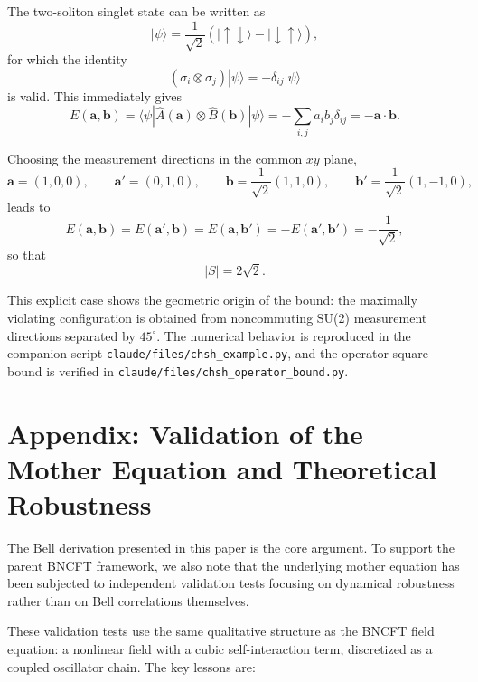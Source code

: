 ﻿\documentclass[11pt,a4paper]{article}
\begin{document}
The two-soliton singlet state can be written as
\begin{equation}
|\psi\rangle = \frac{1}{\sqrt{2}}(|\uparrow\downarrow\rangle-|\downarrow\uparrow\rangle),
\end{equation}
for which the identity
\begin{equation}
(\sigma_i\otimes\sigma_j)|\psi\rangle = -\delta_{ij}|\psi\rangle
\end{equation}
is valid. This immediately gives
\begin{equation}
E(\mathbf{a},\mathbf{b}) = \langle\psi|\hat{A}(\mathbf{a})\otimes\hat{B}(\mathbf{b})|\psi\rangle
= -\sum_{i,j}a_i b_j \delta_{ij} = -\mathbf{a}\cdot\mathbf{b}.
\end{equation}

Choosing the measurement directions in the common $xy$ plane,
\begin{equation}
\mathbf{a}=(1,0,0),\qquad \mathbf{a}'=(0,1,0),\qquad
\mathbf{b}=\frac{1}{\sqrt{2}}(1,1,0),\qquad \mathbf{b}'=\frac{1}{\sqrt{2}}(1,-1,0),
\end{equation}
leads to
\begin{equation}
E(\mathbf{a},\mathbf{b})=E(\mathbf{a}',\mathbf{b})=E(\mathbf{a},\mathbf{b}')=-E(\mathbf{a}',\mathbf{b}')=-\frac{1}{\sqrt{2}},
\end{equation}
so that
\begin{equation}
|S| = 2\sqrt{2}.
\end{equation}

This explicit case shows the geometric origin of the bound: the maximally violating configuration is obtained from noncommuting SU(2) measurement directions separated by $45^\circ$. The numerical behavior is reproduced in the companion script \texttt{claude/files/chsh_example.py}, and the operator-square bound is verified in \texttt{claude/files/chsh_operator_bound.py}.

\section*{Appendix: Validation of the Mother Equation and Theoretical Robustness}

The Bell derivation presented in this paper is the core argument. To support the parent BNCFT framework, we also note that the underlying mother equation has been subjected to independent validation tests focusing on dynamical robustness rather than on Bell correlations themselves.

These validation tests use the same qualitative structure as the BNCFT field equation: a nonlinear field with a cubic self-interaction term, discretized as a coupled oscillator chain. The key lessons are:
\end{document}
